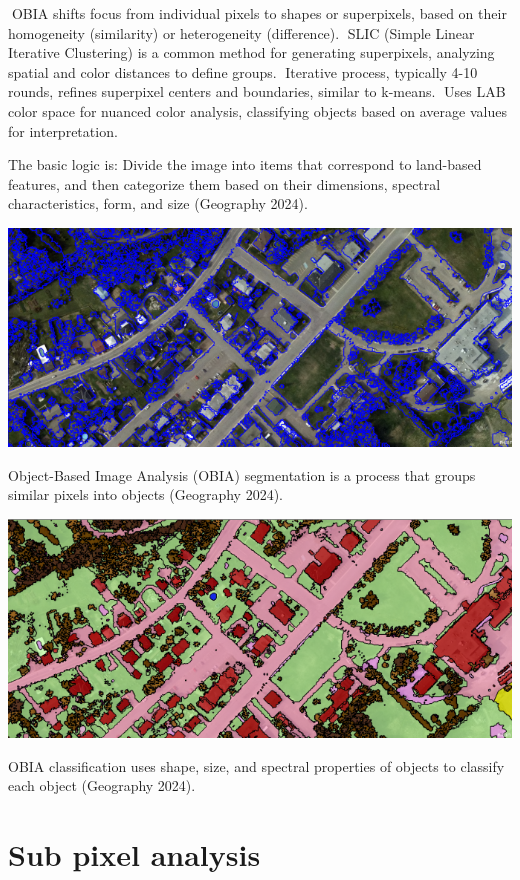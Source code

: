 \documentclass[
  letterpaper,
  DIV=11,
  numbers=noendperiod]{scrreprt}
\begin{document}
OBIA shifts focus from individual pixels to shapes or superpixels,
based on their homogeneity (similarity) or heterogeneity (difference).
SLIC (Simple Linear Iterative Clustering) is a common method for
generating superpixels, analyzing spatial and color distances to define
groups. Iterative process, typically 4-10 rounds, refines superpixel
centers and boundaries, similar to k-means. Uses LAB color space for
nuanced color analysis, classifying objects based on average values for
interpretation.

The basic logic is: Divide the image into items that correspond to
land-based features, and then categorize them based on their dimensions,
spectral characteristics, form, and size (Geography 2024).

\includegraphics{OBIA1.png}

Object-Based Image Analysis (OBIA) segmentation is a process that groups
similar pixels into objects (Geography 2024).

\includegraphics{OBIA2.png}

OBIA classification uses shape, size, and spectral properties of objects
to classify each object (Geography 2024).

\section{Sub pixel analysis}\label{sub-pixel-analysis}
\end{document}
